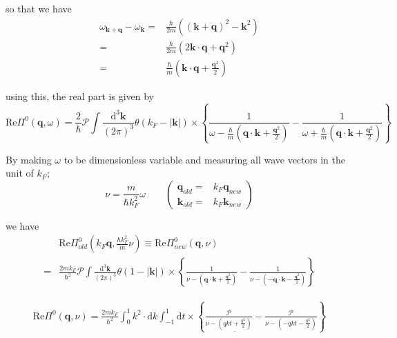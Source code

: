 so that we have
\begin{equation} \label{Eqs2.8.17} \begin{split}
\omega_{\mathbf{k}+\mathbf{q}} - \omega_{\mathbf{k}} =& \frac{\hbar}{2m}\left( (\mathbf{k}+\mathbf{q})^2-\mathbf{k}^2 \right)\\
=& \frac{\hbar}{2m}\left( 2 \mathbf{k} \cdot \mathbf{q} + \mathbf{q}^2 \right)\\
=& \frac{\hbar}{m} \left( \mathbf{k}\cdot \mathbf{q} + \frac{\mathbf{q}^2}{2} \right)
\end{split}\end{equation}

using this, the real part is given by
\[ \text{Re} \Pi^0(\mathbf{q},\omega) = \frac{2}{\hbar} \mathscr{P} \int \frac{\mathrm{d}^3 \mathbf{k}}{(2\pi)^3} \theta(k_F - |\mathbf{k}|) \times \left\{ \frac{1}{\omega-\frac{\hbar}{m}(\mathbf{q}\cdot\mathbf{k}+\frac{\mathbf{q}^2}{2})} - \frac{1}{\omega+\frac{\hbar}{m}(\mathbf{q}\cdot\mathbf{k}+\frac{\mathbf{q}^2}{2})} \right\}
\]

By making $\omega$ to be dimensionless variable and measuring all wave vectors in the unit of $k_F$;
\begin{equation} \label{Eqs2.8.18}
\nu = \frac{m}{\hbar k_F^2} \omega \qquad
\left( \begin{split} \mathbf{q}_{old} =& k_F \mathbf{q}_{new}\\
\mathbf{k}_{old} =& k_F \mathbf{k}_{new}  \end{split}\right)
\end{equation}

we have
\[ \begin{split} &\text{Re} \Pi^0_{old}(k_F\mathbf{q},\frac{\hbar k_F^2}{m}\nu) \equiv \text{Re} \Pi^0_{new}(\mathbf{q},\nu) \\
=& \frac{2 m k_F}{\hbar^2} \mathscr{P} \int \frac{\mathrm{d}^3 \mathbf{k}}{(2\pi)^3} \theta(1 - |\mathbf{k}|) \times \left\{ \frac{1}{\nu-(\mathbf{q}\cdot\mathbf{k} + \frac{\mathbf{q}^2}{2})} - \frac{1}{\nu-(-\mathbf{q}\cdot\mathbf{k}-\frac{\mathbf{q}^2}{2})} \right\}
\end{split}\]

\begin{equation} \label{Eqs2.8.19} \begin{split} \text{Re} \Pi^0(\mathbf{q},\nu)
= \frac{2 m k_F}{\hbar^2} \int_0^1 k^2 \cdot \mathrm{d} k \int_{-1}^{1} \mathrm{d} t \times \left\{ \frac{\mathscr{P}}{\nu-\underline{(q k t + \frac{q^2}{2})}} - \frac{\mathscr{P}}{\nu-(-q k t-\frac{q^2}{2})} \right\}
\end{split}\end{equation}

